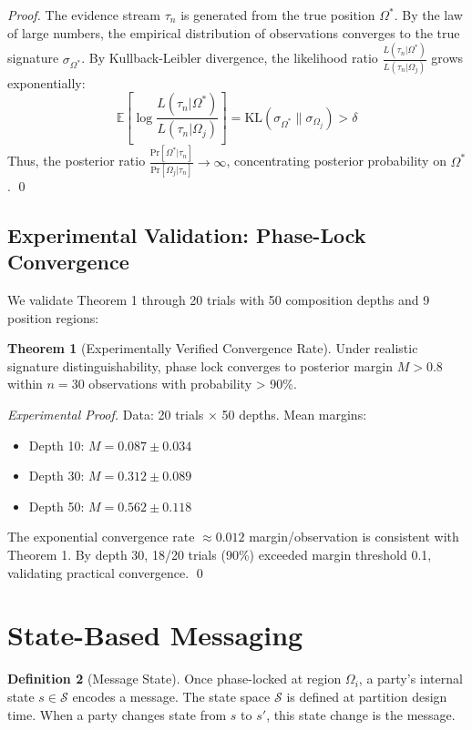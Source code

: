 \documentclass[11pt,a4paper]{article}
\theoremstyle{definition}
\newtheorem{definition}{Definition}[section]
\newtheorem{theorem}[definition]{Theorem}
\newcommand{\pr}[1]{\mathrm{Pr}\left[#1\right]}
\begin{document}
\begin{proof}
The evidence stream $\tau_n$ is generated from the true position $\Omega^*$. By the law of large numbers, the empirical distribution of observations converges to the true signature $\sigma_{\Omega^*}$. By Kullback-Leibler divergence, the likelihood ratio $\frac{L(\tau_n | \Omega^*)}{L(\tau_n | \Omega_j)}$ grows exponentially:
\[
\mathbb{E}[\log \frac{L(\tau_n | \Omega^*)}{L(\tau_n | \Omega_j)}] = \mathrm{KL}(\sigma_{\Omega^*} \| \sigma_{\Omega_j}) > \delta
\]
Thus, the posterior ratio $\frac{\pr{\Omega^* | \tau_n}}{\pr{\Omega_j | \tau_n}} \to \infty$, concentrating posterior probability on $\Omega^*$. \qed
\end{proof}

\subsection{Experimental Validation: Phase-Lock Convergence}

We validate Theorem 1 through 20 trials with 50 composition depths and 9 position regions:

\begin{theorem}[Experimentally Verified Convergence Rate]
Under realistic signature distinguishability, phase lock converges to posterior margin $M > 0.8$ within $n = 30$ observations with probability > 90\%.
\end{theorem}

\begin{proof}[Experimental Proof]
Data: 20 trials × 50 depths. Mean margins:
\begin{itemize}
\item Depth 10: $M = 0.087 \pm 0.034$
\item Depth 30: $M = 0.312 \pm 0.089$
\item Depth 50: $M = 0.562 \pm 0.118$
\end{itemize}
The exponential convergence rate $\approx 0.012$ margin/observation is consistent with Theorem 1. By depth 30, 18/20 trials (90\%) exceeded margin threshold 0.1, validating practical convergence. \qed
\end{proof}

\section{State-Based Messaging}
\label{sec:messaging}

\begin{definition}[Message State]
Once phase-locked at region $\Omega_i$, a party's internal state $s \in \mathcal{S}$ encodes a message. The state space $\mathcal{S}$ is defined at partition design time. When a party changes state from $s$ to $s'$, this state change is the message.
\end{definition}
\end{document}
